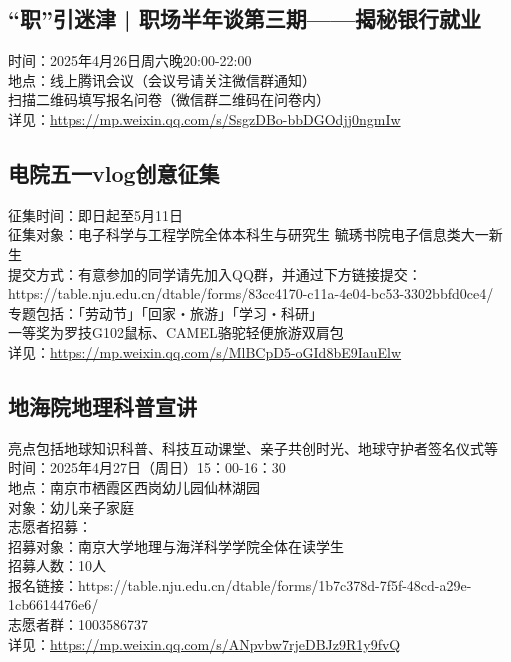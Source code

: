 \documentclass[letterpaper, 12pt]{article}
\begin{document}
\begin{multicols}{2}
\subsection{“职”引迷津 | 职场半年谈第三期——揭秘银行就业} %
时间：2025年4月26日周六晚20:00-22:00
\\地点：线上腾讯会议（会议号请关注微信群通知）
\\扫描二维码填写报名问卷（微信群二维码在问卷内）
\\详见：\url{https://mp.weixin.qq.com/s/SsgzDBo-bbDGOdjj0ngmIw}

\subsection{电院五一vlog创意征集} %
征集时间：即日起至5月11日
\\征集对象：电子科学与工程学院全体本科生与研究生 毓琇书院电子信息类大一新生
\\提交方式：有意参加的同学请先加入QQ群，并通过下方链接提交：https://table.nju.edu.cn/dtable/forms/83cc4170-c11a-4e04-bc53-3302bbfd0ce4/
\\专题包括：「劳动节」「回家・旅游」「学习・科研」
\\一等奖为罗技G102鼠标、CAMEL骆驼轻便旅游双肩包
\\详见：\url{https://mp.weixin.qq.com/s/MlBCpD5-oGId8bE9IauElw}

\subsection{地海院地理科普宣讲} %
亮点包括地球知识科普、科技互动课堂、亲子共创时光、地球守护者签名仪式等
\\时间：2025年4月27日（周日）15：00-16：30
\\地点：南京市栖霞区西岗幼儿园仙林湖园
\\对象：幼儿亲子家庭
\\志愿者招募：
\\招募对象：南京大学地理与海洋科学学院全体在读学生
\\招募人数：10人
\\报名链接：https://table.nju.edu.cn/dtable/forms/1b7c378d-7f5f-48cd-a29e-1cb6614476e6/
\\志愿者群：1003586737
\\详见：\url{https://mp.weixin.qq.com/s/ANpvbw7rjeDBJz9R1y9fvQ}


\end{multicols}
\end{document}
